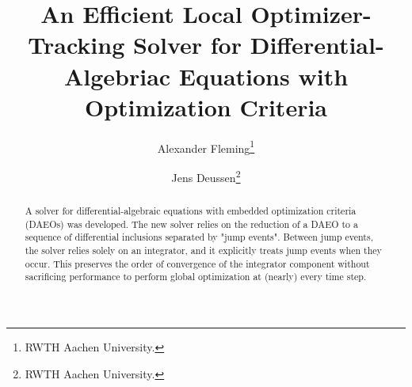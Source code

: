 \documentclass[twoside,leqno,twocolumn]{article}
\begin{document}
%
\newcommand\relatedversion{}



\title{\Large An Efficient Local Optimizer-Tracking Solver for Differential-Algebriac Equations with Optimization Criteria\relatedversion}
\author{Alexander Fleming\thanks{RWTH Aachen University.}
\and Jens Deussen\thanks{RWTH Aachen University.}}

\date{}

\maketitle







\begin{abstract} \small\baselineskip=9pt A solver for differential-algebraic equations with embedded optimization criteria (DAEOs) was developed. The new solver relies on the reduction of a DAEO to a sequence of differential inclusions separated by "jump events". Between jump events, the solver relies solely on an integrator, and it explicitly treats jump events when they occur. This preserves the order of convergence of the integrator component without sacrificing performance to perform global optimization at (nearly) every time step.
\end{abstract}
\end{document}
